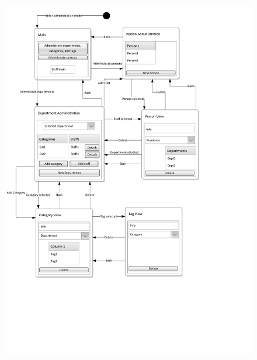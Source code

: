 \begin{figure}[htbp]
	\centering
		\includegraphics[width = \textwidth, clip=true, trim=0 5cm 3cm 0]{input/application_domain_analysis/Navigation_DiagramAdmin.pdf}
	\morscaption{\ainterface[c]}
	\label{fig:Navigation_DiagramStaff}
\end{figure}

